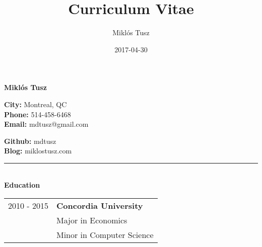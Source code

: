 \documentclass[10pt,notitlepage,oneside,draft]{article}
\title{Curriculum Vitae}
\author{Miklós Tusz}
\date{2017-04-30}
\begin{document}
\begin{flushleft}

  \Huge
  \textbf{Miklós Tusz}

  \small

  \begin{multicols}{2}

    \begin{flushleft}
      \textbf{City:} Montreal, QC \\
      \textbf{Phone:} 514-458-6468 \\
      \textbf{Email:} mdtusz@gmail.com \\
    \end{flushleft}

    \begin{flushright}
      \textbf{Github:} mdtusz \\
      \textbf{Blog:} miklostusz.com \\
    \end{flushright}

  \end{multicols}

  \rule{\textwidth}{1pt}\\[6pt]

  \large
  \textbf{Education} \\
  \vspace{12pt}
  \normalsize
  \begin{tabular}{ p{86pt} | l  }
    2010 - 2015 & \textbf{Concordia University} \\
    & Major in Economics \\
    & Minor in Computer Science \\
  \end{tabular}
  \vspace{20pt}



\end{flushleft}
\end{document}
